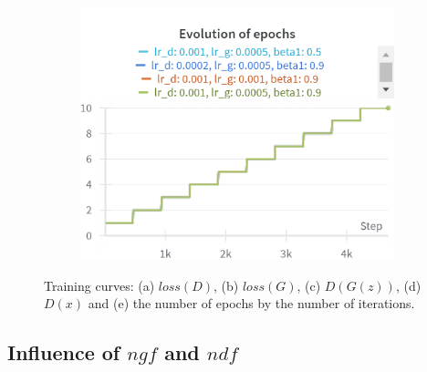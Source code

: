 \begin{figure}[H]
    \begin{subfigure}{0.45\textwidth}
        \centering
        \includegraphics[width=0.95\linewidth]{lr/epochs.png}
        \caption{}
        \label{subfig:lr/epochs}
    \end{subfigure}%

    \caption{Training curves: (a) $loss(D)$, (b) $loss(G)$, (c) $D(G(z))$, (d) $D(x)$ and (e) the number of epochs by the number of iterations.}
    \label{fig:lr_losses}
\end{figure}

\subsection{Influence of $ngf$ and $ndf$} \label{appendix:ngf_ndf}

